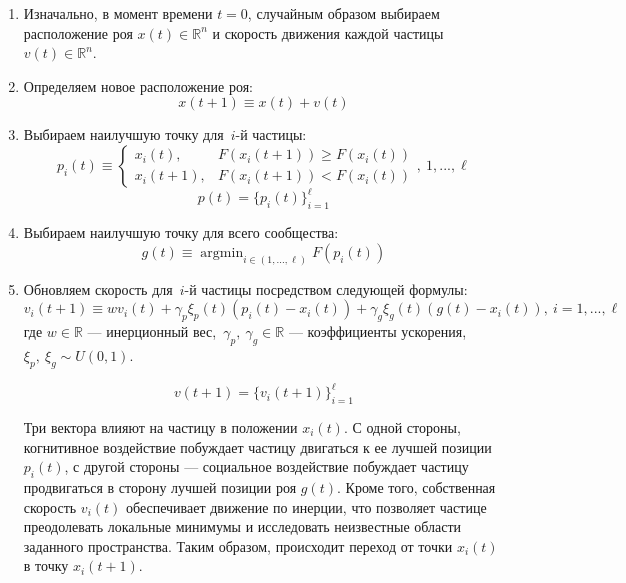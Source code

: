 \begin{enumerate}
	\item Изначально, в момент времени $t=0$, случайным образом выбираем расположение роя $x(t) \in \mathbb{R}^n$ и скорость движения каждой частицы $v(t) \in \mathbb{R}^n$.

	\item Определяем новое расположение роя:
	\[
		x(t + 1) \equiv x(t) + v(t)
	\]

	\item Выбираем наилучшую точку для~$i$-й частицы:
	\[
		p_i(t)
		\equiv
		\begin{cases}
			x_i(t),
			&
			F(x_i(t + 1)) \geq F(x_i(t))
			\\
			x_i(t + 1),
			&
			F(x_i(t + 1)) < F(x_i(t))
		\end{cases}, \ 1, ..., \ell
	\]
	\[
		p(t) = \{p_i(t)\}_{i = 1}^{\ell}
	\]

	\item Выбираем наилучшую точку для всего сообщества:
	\[
		g(t)
		\equiv
		\mathop{\mathrm{argmin}}_{i \in (1, ..., \ell)} \limits F(p_i(t))
	\]

	\item Обновляем скорость для~$i$-й частицы посредством следующей формулы:
	\[
		v_i(t + 1)
		\equiv
		w
		v_i(t)
		+
		\gamma_p
		\xi_p(t)
		(p_i(t) - x_i(t))
		+
		\gamma_g
		\xi_g(t)
		(g(t) - x_i(t)), \
		i = 1, ..., \ell
	\]
	где $w \in \mathbb{R}$ --- инерционный вес,~$\gamma_p,\ \gamma_g \in \mathbb{R}$ --- коэффициенты ускорения, $\xi_p,\ \xi_g \sim U(0, 1)$.

	\[
		v(t+1) = \{v_i(t + 1)\}_{i = 1}^{\ell}
	\]

	Три вектора влияют на частицу в положении $x_i(t)$. С одной стороны, когнитивное воздействие побуждает частицу двигаться к ее лучшей позиции $p_i(t)$, с другой стороны --- социальное воздействие побуждает частицу продвигаться в сторону лучшей позиции роя $g(t)$. Кроме того, собственная скорость $v_i(t)$ обеспечивает движение по инерции, что позволяет частице преодолевать локальные минимумы и исследовать неизвестные области заданного пространства. Таким образом, происходит переход от точки $x_i(t)$ в точку $x_i(t+1)$.


	\begin{tikzpicture}[x=0.75pt,y=0.75pt,yscale=-1,xscale=1]
	\centering


\end{tikzpicture}
\end{enumerate}
